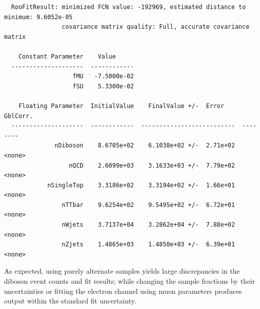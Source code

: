 \begin{itemize}
{\begin{verbatim}
  RooFitResult: minimized FCN value: -192969, estimated distance to minimum: 9.6052e-05
                covariance matrix quality: Full, accurate covariance matrix

    Constant Parameter    Value     
  --------------------  ------------
                   fMU   -7.5000e-02
                   fSU    5.3300e-02

    Floating Parameter  InitialValue    FinalValue +/-  Error     GblCorr.
  --------------------  ------------  --------------------------  --------
              nDiboson    8.6705e+02    6.1038e+02 +/-  2.71e+02  <none>
                  nQCD    2.6099e+03    3.1633e+03 +/-  7.79e+02  <none>
            nSingleTop    3.3186e+02    3.3194e+02 +/-  1.66e+01  <none>
                nTTbar    9.6254e+02    9.5495e+02 +/-  6.72e+01  <none>
                nWjets    3.7137e+04    3.2862e+04 +/-  7.88e+02  <none>
                nZjets    1.4865e+03    1.4850e+03 +/-  6.39e+01  <none>

\end{verbatim}
}

\end{itemize}

As expected, using purely alternate samples yields large discrepancies in the diboson event counts and fit results; while changing the sample fractions by their uncertainties or fitting the electron channel using muon parameters produces output within the standard fit uncertainty.


